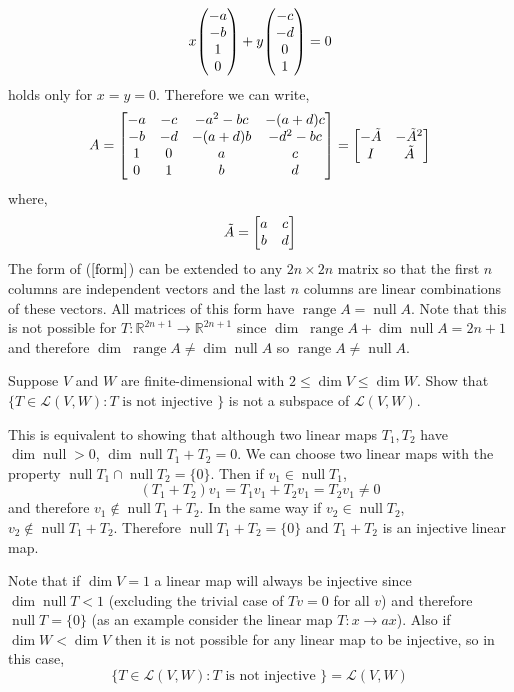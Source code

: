 \documentclass[11pt,a4paper]{scrartcl}
\DeclareMathOperator{\range}{range}
\DeclareMathOperator{\nspace}{null}
\newcommand{\lmap}[2]{\mathcal{L}(#1,#2)}
\newcommand{\RR}{\mathbb{R}}
\newcounter{problem}
\begin{document}
\begin{problem}[3.B.5]
{\begin{equation}
        x \mqty( -a \\ -b \\ 1 \\ 0) + y \mqty(-c \\ -d \\ 0 \\ 1) =0 
        \end{equation}
        holds only for $x=y=0$. Therefore we can write,
        \begin{equation}
        A=\mqty[
        -a & -c & -a^2-bc & -(a+d)c \\
        -b & -d & -(a+d)b & -d^2-bc \\
        1 & 0 & a & c \\
        0 & 1 & b & d 
        ]
        =
        \mqty[
        -{\tilde A}  & -{\tilde A}^2 \\
        I & {\tilde A}
        ]
        \label{form}
        \end{equation}  
        where,
        \begin{equation}
        {\tilde A}= \mqty[a & c \\ b & d]
        \end{equation}  
        The form of ($\ref{form}$) can be extended to any $2n \times 2n$ matrix so that the first
        $n$ columns are independent vectors and the last $n$ columns are linear combinations of these
        vectors. All matrices of this form have $\range A=\nspace A$.  
        Note that this is not possible for $T:\RR^{2n+1}\rightarrow \RR^{2n+1}$ since 
        $\dim\;\range A+\dim \nspace A=2n+1$ and therefore 
        $\dim\;\range A \neq \dim \nspace A$ so $\range A \neq \nspace A$.  
    }
\end{problem}

\begin{problem}[3.B.7]
    {
        Suppose $V$ and $W$ are finite-dimensional with $2 \leq \dim V \leq \dim W$.
        Show that $\{T \in \lmap{V}{W}: T \text{ is not injective }\}$ is not a 
        subspace of $\lmap{V}{W}$.
    }
    {
        This is equivalent to showing that although two linear maps $T_1,T_2$ have
        $\dim \nspace > 0$, $\dim \nspace T_1+T_2 = 0$. We can choose two linear
        maps with the property $\nspace T_1 \cap \nspace T_2 = \{0\} $.  Then if
        $v_1 \in \nspace T_1$,
        \[
        (T_1+T_2)v_1=T_1v_1+T_2v_1=T_2v_1 \neq 0    
        \]
        and therefore $v_1 \notin \nspace T_1+T_2$. In the same way if $v_2 \in \nspace T_2$,
        $v_2 \notin \nspace T_1+T_2$. Therefore $\nspace T_1+T_2=\{0\}$ and $T_1+T_2$ is 
        an injective linear map.

        Note that if $\dim V=1$ a linear map will always be injective since $\dim \nspace T<1$
        (excluding the trivial case of $Tv=0$ for all $v$)
        and therefore $\nspace T = \{0\}$ (as an example consider the linear map $T:x\rightarrow ax$).
        Also if $\dim W < \dim V$ then it is not possible for any linear map to be injective, so 
        in this case,
        \[
            \{T \in \lmap{V}{W}: T \text{ is not injective }\}=\lmap{V}{W}
        \]
    }
\end{problem}
\end{document}
